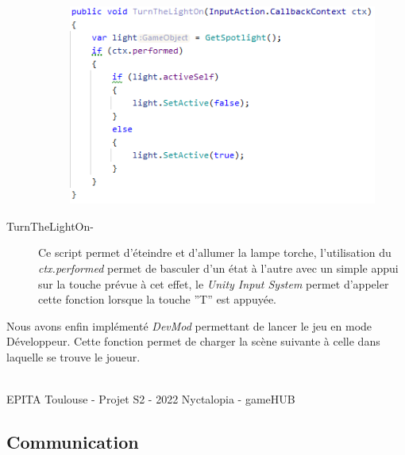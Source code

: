 \begin{description}
    \begin{figure}[H]
\centering
\begin{minipage}{.5\textwidth}
  \centering
  \centerline{\includegraphics[width=1.2\linewidth]{img/gameplay/turnthelighton.PNG}}
  \label{fig:octobercrowfont}
\end{minipage}%
\end{figure}
    \item[\emph{} TurnTheLightOn-] Ce script permet d’éteindre et d’allumer la lampe torche, l’utilisation du \emph{ctx.performed} permet de basculer d’un état à l’autre avec un simple appui sur la touche prévue à cet effet, le \emph{Unity Input System} permet d’appeler cette fonction lorsque la touche ''T'' est appuyée.
\end{description}

\vspace*{7mm}

\par

Nous avons enfin implémenté \emph{DevMod} permettant de lancer le jeu en mode Développeur. Cette fonction permet de charger la scène suivante à celle dans laquelle se trouve le joueur.

\vfill
\noindent\makebox[\linewidth]{\rule{.8\paperwidth}{.6pt}}\\[0.2cm]
EPITA Toulouse - Projet S2 - 2022 \hfill Nyctalopia - gameHUB
\noindent\makebox[\linewidth]{\rule{.8\paperwidth}{.6pt}}
\newpage

\subsection{Communication}
\setlength{\parindent}{5ex}

